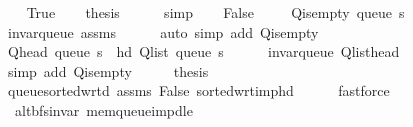 \begin{isabellebody}
\ \ \isamarkupfalse%
\ True\isanewline
\ \ \isamarkupfalse%
\ {\isacharquery}{\kern0pt}thesis\isanewline
\ \ \ \ \isamarkupfalse%
\ simp\isanewline
{}\isamarkupfalse%
\isanewline
\ \ \isamarkupfalse%
\ False\isanewline
\ \ \isamarkupfalse%
\ {\isachardoublequoteopen}{\isasymnot}\ Q{\isacharunderscore}{\kern0pt}is{\isacharunderscore}{\kern0pt}empty\ {\isacharparenleft}{\kern0pt}queue\ s{\isacharparenright}{\kern0pt}{\isachardoublequoteclose}\isanewline
\ \ \ \ \isamarkupfalse%
\ invar{\isacharunderscore}{\kern0pt}queue\ assms\isanewline
\ \ \ \ \isamarkupfalse%
\ {\isacharparenleft}{\kern0pt}auto\ simp\ add{\isacharcolon}{\kern0pt}\ Q{\isachardot}{\kern0pt}is{\isacharunderscore}{\kern0pt}empty{\isacharparenright}{\kern0pt}\isanewline
\ \ \isamarkupfalse%
\ \isamarkupfalse%
\ {\isachardoublequoteopen}Q{\isacharunderscore}{\kern0pt}head\ {\isacharparenleft}{\kern0pt}queue\ s{\isacharparenright}{\kern0pt}\ {\isacharequal}{\kern0pt}\ hd\ {\isacharparenleft}{\kern0pt}Q{\isacharunderscore}{\kern0pt}list\ {\isacharparenleft}{\kern0pt}queue\ s{\isacharparenright}{\kern0pt}{\isacharparenright}{\kern0pt}{\isachardoublequoteclose}\isanewline
\ \ \ \ \isamarkupfalse%
\ invar{\isacharunderscore}{\kern0pt}queue\ Q{\isachardot}{\kern0pt}list{\isacharunderscore}{\kern0pt}head\isanewline
\ \ \ \ \isamarkupfalse%
\ {\isacharparenleft}{\kern0pt}simp\ add{\isacharcolon}{\kern0pt}\ Q{\isachardot}{\kern0pt}is{\isacharunderscore}{\kern0pt}empty{\isacharparenright}{\kern0pt}\isanewline
\ \ \isamarkupfalse%
\ \isamarkupfalse%
\ {\isacharquery}{\kern0pt}thesis\isanewline
\ \ \ \ \isamarkupfalse%
\ queue{\isacharunderscore}{\kern0pt}sorted{\isacharunderscore}{\kern0pt}wrt{\isacharunderscore}{\kern0pt}d\ assms\ False\ sorted{\isacharunderscore}{\kern0pt}wrt{\isacharunderscore}{\kern0pt}imp{\isacharunderscore}{\kern0pt}hd\isanewline
\ \ \ \ \isamarkupfalse%
\ fastforce\isanewline
{}\isamarkupfalse%
%
\endisatagproof
{\isafoldproof}%
%
\isadelimproof
\isanewline
%
\endisadelimproof
\isanewline
{}\isamarkupfalse%
\ {\isacharparenleft}{\kern0pt}\ alt{\isacharunderscore}{\kern0pt}bfs{\isacharunderscore}{\kern0pt}invar{\isacharparenright}{\kern0pt}\ mem{\isacharunderscore}{\kern0pt}queue{\isacharunderscore}{\kern0pt}imp{\isacharunderscore}{\kern0pt}d{\isacharunderscore}{\kern0pt}le{\isacharcolon}{\kern0pt}\isanewline

\end{isabellebody}
